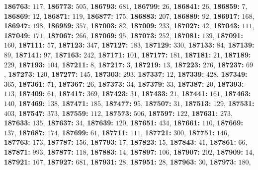 \textsf{\bfseries 186763:} $117$, \textsf{\bfseries 186773:} $505$, \textsf{\bfseries 186793:} $681$, \textsf{\bfseries 186799:} $26$, \textsf{\bfseries 186841:} $26$, \textsf{\bfseries 186859:} $7$, \textsf{\bfseries 186869:} $12$, \textsf{\bfseries 186871:} $119$, \textsf{\bfseries 186877:} $175$, \textsf{\bfseries 186883:} $207$, \textsf{\bfseries 186889:} $92$, \textsf{\bfseries 186917:} $168$, \textsf{\bfseries 186947:} $198$, \textsf{\bfseries 186959:} $357$, \textsf{\bfseries 187003:} $82$, \textsf{\bfseries 187009:} $233$, \textsf{\bfseries 187027:} $42$, \textsf{\bfseries 187043:} $111$, \textsf{\bfseries 187049:} $171$, \textsf{\bfseries 187067:} $266$, \textsf{\bfseries 187069:} $95$, \textsf{\bfseries 187073:} $252$, \textsf{\bfseries 187081:} $139$, \textsf{\bfseries 187091:} $160$, \textsf{\bfseries 187111:} $57$, \textsf{\bfseries 187123:} $347$, \textsf{\bfseries 187127:} $183$, \textsf{\bfseries 187129:} $330$, \textsf{\bfseries 187133:} $84$, \textsf{\bfseries 187139:} $89$, \textsf{\bfseries 187141:} $97$, \textsf{\bfseries 187163:} $242$, \textsf{\bfseries 187171:} $101$, \textsf{\bfseries 187177:} $181$, \textsf{\bfseries 187181:} $21$, \textsf{\bfseries 187189:} $229$, \textsf{\bfseries 187193:} $104$, \textsf{\bfseries 187211:} $8$, \textsf{\bfseries 187217:} $3$, \textsf{\bfseries 187219:} $13$, \textsf{\bfseries 187223:} $276$, \textsf{\bfseries 187237:} $69$, \textsf{\bfseries 187273:} $120$, \textsf{\bfseries 187277:} $145$, \textsf{\bfseries 187303:} $293$, \textsf{\bfseries 187337:} $12$, \textsf{\bfseries 187339:} $428$, \textsf{\bfseries 187349:} $365$, \textsf{\bfseries 187361:} $71$, \textsf{\bfseries 187367:} $26$, \textsf{\bfseries 187373:} $34$, \textsf{\bfseries 187379:} $33$, \textsf{\bfseries 187387:} $20$, \textsf{\bfseries 187393:} $113$, \textsf{\bfseries 187409:} $61$, \textsf{\bfseries 187417:} $369$, \textsf{\bfseries 187423:} $31$, \textsf{\bfseries 187433:} $21$, \textsf{\bfseries 187441:} $161$, \textsf{\bfseries 187463:} $140$, \textsf{\bfseries 187469:} $138$, \textsf{\bfseries 187471:} $185$, \textsf{\bfseries 187477:} $95$, \textsf{\bfseries 187507:} $31$, \textsf{\bfseries 187513:} $129$, \textsf{\bfseries 187531:} $403$, \textsf{\bfseries 187547:} $373$, \textsf{\bfseries 187559:} $112$, \textsf{\bfseries 187573:} $506$, \textsf{\bfseries 187597:} $122$, \textsf{\bfseries 187631:} $273$, \textsf{\bfseries 187633:} $135$, \textsf{\bfseries 187637:} $34$, \textsf{\bfseries 187639:} $120$, \textsf{\bfseries 187651:} $434$, \textsf{\bfseries 187661:} $110$, \textsf{\bfseries 187669:} $137$, \textsf{\bfseries 187687:} $174$, \textsf{\bfseries 187699:} $61$, \textsf{\bfseries 187711:} $111$, \textsf{\bfseries 187721:} $300$, \textsf{\bfseries 187751:} $146$, \textsf{\bfseries 187763:} $173$, \textsf{\bfseries 187787:} $156$, \textsf{\bfseries 187793:} $17$, \textsf{\bfseries 187823:} $15$, \textsf{\bfseries 187843:} $41$, \textsf{\bfseries 187861:} $66$, \textsf{\bfseries 187871:} $993$, \textsf{\bfseries 187877:} $118$, \textsf{\bfseries 187883:} $14$, \textsf{\bfseries 187897:} $106$, \textsf{\bfseries 187907:} $202$, \textsf{\bfseries 187909:} $14$, \textsf{\bfseries 187921:} $167$, \textsf{\bfseries 187927:} $681$, \textsf{\bfseries 187931:} $28$, \textsf{\bfseries 187951:} $28$, \textsf{\bfseries 187963:} $30$, \textsf{\bfseries 187973:} $180$, 
